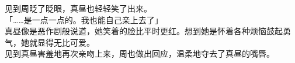 见到周眨了眨眼，真昼也轻轻笑了出来。\\

「……是一点一点的。我也能自己亲上去了」\\

真昼像是恶作剧般说道，她笑着的脸比平时更红。想到她是怀着各种烦恼鼓起勇气，她就显得无比可爱。\\

见到真昼害羞地再次亲吻上来，周也做出回应，温柔地夺去了真昼的嘴唇。
